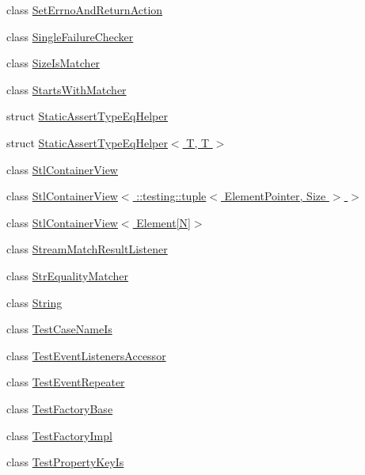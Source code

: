 \begin{DoxyCompactItemize}
\item 
class \hyperlink{classtesting_1_1internal_1_1SetErrnoAndReturnAction}{Set\+Errno\+And\+Return\+Action}
\item 
class \hyperlink{classtesting_1_1internal_1_1SingleFailureChecker}{Single\+Failure\+Checker}
\item 
class \hyperlink{classtesting_1_1internal_1_1SizeIsMatcher}{Size\+Is\+Matcher}
\item 
class \hyperlink{classtesting_1_1internal_1_1StartsWithMatcher}{Starts\+With\+Matcher}
\item 
struct \hyperlink{structtesting_1_1internal_1_1StaticAssertTypeEqHelper}{Static\+Assert\+Type\+Eq\+Helper}
\item 
struct \hyperlink{structtesting_1_1internal_1_1StaticAssertTypeEqHelper_3_01T_00_01T_01_4}{Static\+Assert\+Type\+Eq\+Helper$<$ T, T $>$}
\item 
class \hyperlink{classtesting_1_1internal_1_1StlContainerView}{Stl\+Container\+View}
\item 
class \hyperlink{classtesting_1_1internal_1_1StlContainerView_3_01_1_1testing_1_1tuple_3_01ElementPointer_00_01Size_01_4_01_4}{Stl\+Container\+View$<$ \+::testing\+::tuple$<$ Element\+Pointer, Size $>$ $>$}
\item 
class \hyperlink{classtesting_1_1internal_1_1StlContainerView_3_01Element[N]_4}{Stl\+Container\+View$<$ Element\mbox{[}\+N\mbox{]}$>$}
\item 
class \hyperlink{classtesting_1_1internal_1_1StreamMatchResultListener}{Stream\+Match\+Result\+Listener}
\item 
class \hyperlink{classtesting_1_1internal_1_1StrEqualityMatcher}{Str\+Equality\+Matcher}
\item 
class \hyperlink{classtesting_1_1internal_1_1String}{String}
\item 
class \hyperlink{classtesting_1_1internal_1_1TestCaseNameIs}{Test\+Case\+Name\+Is}
\item 
class \hyperlink{classtesting_1_1internal_1_1TestEventListenersAccessor}{Test\+Event\+Listeners\+Accessor}
\item 
class \hyperlink{classtesting_1_1internal_1_1TestEventRepeater}{Test\+Event\+Repeater}
\item 
class \hyperlink{classtesting_1_1internal_1_1TestFactoryBase}{Test\+Factory\+Base}
\item 
class \hyperlink{classtesting_1_1internal_1_1TestFactoryImpl}{Test\+Factory\+Impl}
\item 
class \hyperlink{classtesting_1_1internal_1_1TestPropertyKeyIs}{Test\+Property\+Key\+Is}

\end{DoxyCompactItemize}
